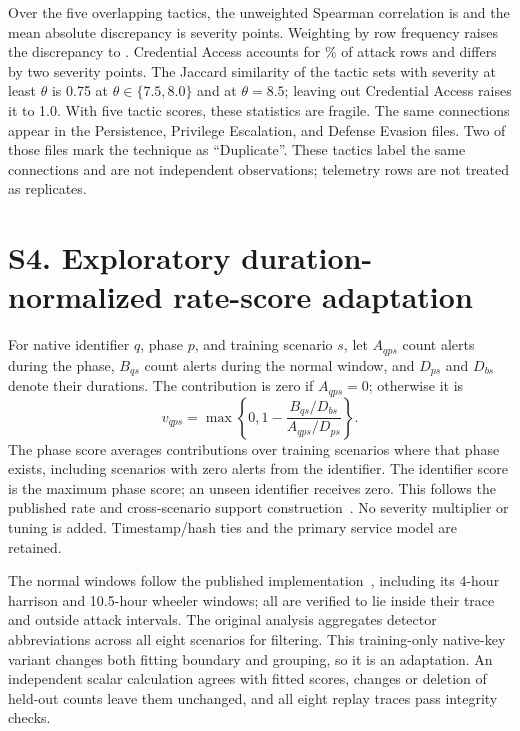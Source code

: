 \documentclass[pdflatex,sn-basic,Numbered]{sn-jnl}
\begin{document}
Over the five overlapping tactics, the unweighted Spearman correlation is \UWFSpearman{} and the mean absolute discrepancy is \UWFMADUnweighted{} severity points. Weighting by row frequency raises the discrepancy to \UWFMADWeighted. Credential Access accounts for \UWFCredentialShare\% of attack rows and differs by two severity points. The Jaccard similarity of the tactic sets with severity at least $\theta$ is 0.75 at $\theta \in \{7.5, 8.0\}$ and \UWFJaccardEightFive{} at $\theta = 8.5$; leaving out Credential Access raises it to 1.0. With five tactic scores, these statistics are fragile. The same \UWFSharedConnections{} connections appear in the Persistence, Privilege Escalation, and Defense Evasion files. Two of those files mark the technique as ``Duplicate''. These tactics label the same connections and are not independent observations; telemetry rows are not treated as replicates.

\begin{tableorg}[t]
\caption{Observed UWF tactics with both author-defined severities. Crosswalk: maximum severity of the AIT phases mapped to the tactic.}
\centering\small\setlength{\tabcolsep}{5pt}
\unskip
\end{tableorg}

\section*{S4. Exploratory duration-normalized rate-score adaptation}
For native identifier $q$, phase $p$, and training scenario $s$, let $A_{qps}$ count alerts during the phase, $B_{qs}$ count alerts during the normal window, and $D_{ps}$ and $D_{bs}$ denote their durations. The contribution is zero if $A_{qps}=0$; otherwise it is
\begin{equation}
 v_{qps}=\max\left\{0,1-\frac{B_{qs}/D_{bs}}{A_{qps}/D_{ps}}\right\}.
\end{equation}
The phase score averages contributions over training scenarios where that phase exists, including scenarios with zero alerts from the identifier. The identifier score is the maximum phase score; an unseen identifier receives zero. This follows the published rate and cross-scenario support construction~\citep{Landauer2024AITADS}. No severity multiplier or tuning is added. Timestamp/hash ties and the primary service model are retained.

The normal windows follow the published implementation~\citep{AITDetectorScoreImplementation}, including its 4-hour harrison and 10.5-hour wheeler windows; all are verified to lie inside their trace and outside attack intervals. The original analysis aggregates detector abbreviations across all eight scenarios for filtering. This training-only native-key variant changes both fitting boundary and grouping, so it is an adaptation. An independent scalar calculation agrees with fitted scores, changes or deletion of held-out counts leave them unchanged, and all eight replay traces pass integrity checks.
\end{document}
